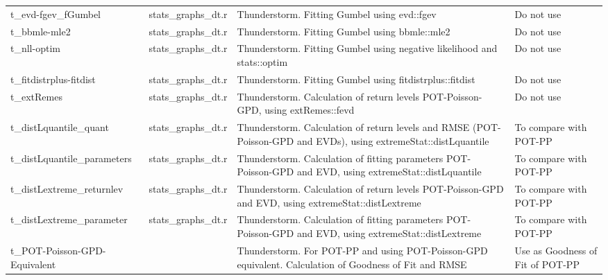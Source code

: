 \documentclass[12pt,oneside]{reedthesis}
\begin{document}
\begin{longtable}[t]{>{\raggedright\arraybackslash}p{1.5in}>{\raggedright\arraybackslash}p{1in}>{\raggedright\arraybackslash}p{2in}>{\raggedright\arraybackslash}p{1.5in}}
t\_evd-fgev\_fGumbel & stats\_graphs\_dt.r & Thunderstorm. Fitting Gumbel using evd::fgev & Do not use\\
t\_bbmle-mle2 & stats\_graphs\_dt.r & Thunderstorm. Fitting Gumbel using bbmle::mle2 & Do not use\\
t\_nll-optim & stats\_graphs\_dt.r & Thunderstorm. Fitting Gumbel using negative likelihood and stats::optim & Do not use\\
t\_fitdistrplus-fitdist & stats\_graphs\_dt.r & Thunderstorm. Fitting Gumbel using fitdistrplus::fitdist & Do not use\\
t\_extRemes & stats\_graphs\_dt.r & Thunderstorm. Calculation of return levels POT-Poisson-GPD, using extRemes::fevd & Do not use\\
t\_distLquantile\_quant & stats\_graphs\_dt.r & Thunderstorm. Calculation of return levels and RMSE (POT-Poisson-GPD and EVDs), using extremeStat::distLquantile & To compare with POT-PP\\
t\_distLquantile\_parameters & stats\_graphs\_dt.r & Thunderstorm. Calculation of fitting parameters POT-Poisson-GPD and EVD, using extremeStat::distLquantile & To compare with POT-PP\\
t\_distLextreme\_returnlev & stats\_graphs\_dt.r & Thunderstorm. Calculation of return levels POT-Poisson-GPD and EVD, using extremeStat::distLextreme & To compare with POT-PP\\
t\_distLextreme\_parameter & stats\_graphs\_dt.r & Thunderstorm. Calculation of fitting parameters POT-Poisson-GPD and EVD, using extremeStat::distLextreme & To compare with POT-PP\\
t\_POT-Poisson-GPD-Equivalent &  & Thunderstorm. For POT-PP and using POT-Poisson-GPD equivalent. Calculation of Goodness of Fit and RMSE & Use as Goodness of Fit of POT-PP\\
\bottomrule
\end{longtable}
\endgroup{}
\end{document}
